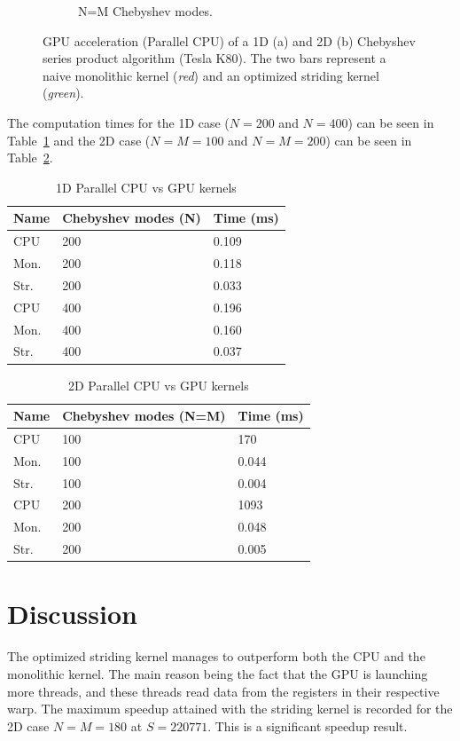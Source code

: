 \documentclass{article}
\begin{document}
\begin{figure}[H]
\begin{subfigure}{.48\textwidth}
		\caption{N=M Chebyshev modes.}
	\end{subfigure}
  \caption{GPU acceleration (Parallel CPU) of a 1D (a) and 2D (b) Chebyshev series product algorithm (Tesla K80). The two bars represent a naive monolithic kernel (\textit{red}) and an optimized striding kernel (\textit{green}).}
  \label{fig:fig1}
\end{figure}
The computation times for the 1D case ($N=200$ and $N=400$) can be seen in Table~\ref{tab:table1} and the 2D case ($N=M=100$ and $N=M=200$) can be seen in Table~\ref{tab:table2}. 
\begin{table}[h]
 \caption{1D Parallel CPU vs GPU kernels}
  \centering
  \begin{tabular}{lll}
    \toprule
    \cmidrule(r){1-2}
    Name     & Chebyshev modes (N)    & Time (ms) \\
    \midrule
    CPU   & 200   & 0.109  \\
    Mon.  & 200   & 0.118  \\
    Str.  & 200   & 0.033  \\
    \midrule
    CPU   & 400   & 0.196  \\
    Mon.  & 400   & 0.160  \\
    Str.  & 400   & 0.037  \\
    \bottomrule
  \end{tabular}
  \label{tab:table1}
\end{table}

\begin{table}[h]
 \caption{2D Parallel CPU vs GPU kernels}
  \centering
  \begin{tabular}{lll}
    \toprule
    \cmidrule(r){1-2}
    Name     & Chebyshev modes (N=M)    & Time (ms) \\
    \midrule
    CPU   & 100   & 170      \\
    Mon.  & 100   & 0.044    \\
    Str.  & 100   & 0.004    \\
    \midrule
    CPU   & 200   & 1093      \\
    Mon.  & 200   & 0.048     \\
    Str.  & 200   & 0.005     \\
    \bottomrule
  \end{tabular}
  \label{tab:table2}
\end{table}

\section{Discussion}
The optimized striding kernel manages to outperform both the CPU and the monolithic kernel. The main reason being the fact that the GPU is launching more threads, and these threads read data from the registers in their respective warp. The maximum speedup attained with the striding kernel is recorded for the 2D case $N=M=180$ at $S=220771$. This is a significant speedup result. 
\end{document}
